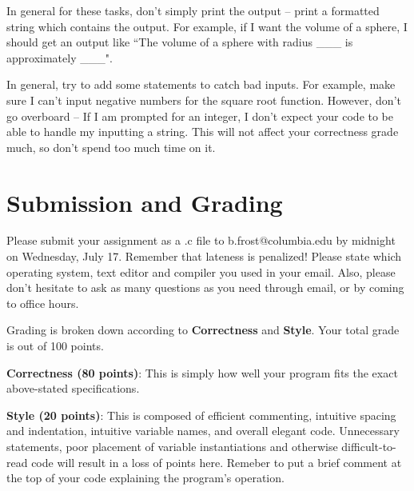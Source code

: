 \documentclass{article}
\begin{document}
In general for these tasks, don't simply print the output -- print a formatted string which contains the output. For example, if I want the volume of a sphere, I should get an output like ``The volume of a sphere with radius \_\_\_ is approximately \_\_\_". 

In general, try to add some statements to catch bad inputs. For example, make sure I can't input negative numbers for the square root function. However, don't go overboard -- If I am prompted for an integer, I don't expect your code to be able to handle my inputting a string. This will not affect your correctness grade much, so don't spend too much time on it.

\section*{Submission and Grading}
Please submit your assignment as a .c file to b.frost@columbia.edu by midnight on Wednesday, July 17. Remember that lateness is penalized! Please state which operating system, text editor and compiler you used in your email. Also, please don't hesitate to ask as many questions as you need through email, or by coming to office hours.

Grading is broken down according to \textbf{Correctness} and \textbf{Style}. Your total grade is out of 100 points.

\noindent\textbf{Correctness (80 points)}: This is simply how well your program fits the exact above-stated specifications.

\noindent\textbf{Style (20 points)}: This is composed of efficient commenting, intuitive spacing and indentation, intuitive variable names, and overall elegant code. Unnecessary statements, poor placement of variable instantiations and otherwise difficult-to-read code will result in a loss of points here. Remeber to put a brief comment at the top of your code explaining the program's operation.
\end{document}
